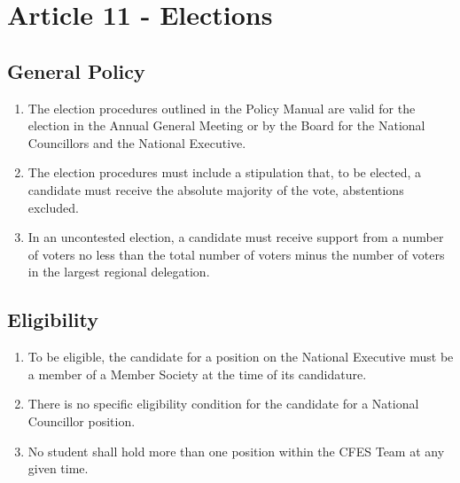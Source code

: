 \section{Article 11 - Elections}
\label{article-11-elections}

\subsection{General Policy}
\label{general-policy}

\begin{enumerate}
 \item The election procedures outlined in the Policy Manual are valid for the election in the Annual General Meeting or by the Board for the National Councillors and the National Executive.
 \item The election procedures must include a stipulation that, to be elected, a candidate must receive the absolute majority of the vote, abstentions excluded.
 \item In an uncontested election, a candidate must receive support from a number of voters no less than the total number of voters minus the number of voters in the largest regional delegation.
\end{enumerate}

\subsection{Eligibility}
\label{eligibility}

\begin{enumerate}
 \item To be eligible, the candidate for a position on the National Executive must be a member of a Member Society at the time of its candidature.
 \item There is no specific eligibility condition for the candidate for a National Councillor position.
 \item No student shall hold more than one position within the CFES Team at any given time.
\end{enumerate}

